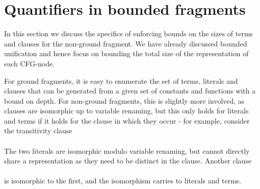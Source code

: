 
\section{Quantifiers in bounded fragments}
In this section we discuss the specifics of enforcing bounds on the sizes of terms and clauses for the non-ground fragment. We have already discussed bounded unification and hence focus on bounding the total size of the representation of each CFG-node.

For ground fragments, it is easy to enumerate the set of terms, literals and clauses that can be generated from a given set of constants and functions with a bound on depth. For non-ground fragments, this is slightly more involved,
as clauses are isomorphic up to variable renaming, but this only holds for literals and terms if it holds for the clause in which they occur - for example, consider the transitivity clause \\
\\
The two literals  are isomorphic modulo variable renaming, but cannot directly share a representation as they need to be distinct in the clause. 
Another clause \\
 \\
is isomorphic to the first, and the isomorphism  carries to literals and terms.

